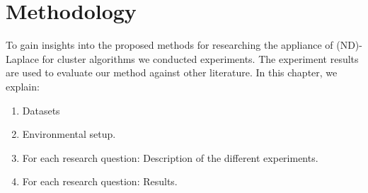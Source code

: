 \chapter{Methodology}

To gain insights into the proposed methods for researching the appliance of (ND)-Laplace for cluster algorithms we conducted experiments.
The experiment results are used to evaluate our method against other literature.
In this chapter, we explain:
\begin{enumerate}

  \item Datasets
  \item Environmental setup.
  \item For each research question: Description of the different experiments.
  \item For each research question: Results.
\end{enumerate}

